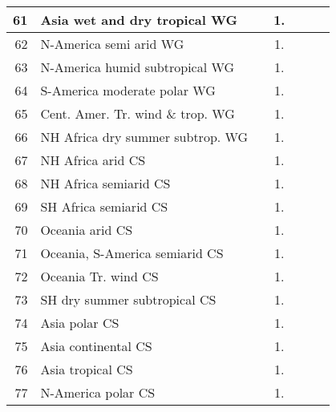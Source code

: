 {{\begin{tabular}{||r|l||c|c|c|c|c||}
 \hline
          61  & Asia wet and dry tropical WG                                 &       &  1.   &       &       \\
 \hline
          62  & N-America semi arid WG                                       &       &  1.   &       &       \\
 \hline
          63  & N-America humid subtropical WG                               &       &  1.   &       &       \\
 \hline
          64  & S-America moderate polar WG                                  &       &  1.   &       &       \\
 \hline
          65  & Cent. Amer. Tr. wind \& trop. WG                             &       &  1.   &       &       \\
 \hline
          66  & NH Africa dry summer subtrop. WG                             &       &  1.   &       &       \\
 \hline
 \hline
          67  & NH Africa arid CS                                            &       &  1.   &       &       \\
 \hline
          68  & NH Africa semiarid CS                                        &       &  1.   &       &       \\
 \hline
          69  & SH Africa semiarid CS                                        &       &  1.   &       &       \\
 \hline
          70  & Oceania arid CS                                              &       &  1.   &       &       \\
 \hline
          71  & Oceania, S-America semiarid CS                               &       &  1.   &       &       \\
 \hline
          72  & Oceania Tr. wind CS                                          &       &  1.   &       &       \\
 \hline
          73  & SH dry summer subtropical CS                                 &       &  1.   &       &       \\
 \hline
          74  & Asia polar CS                                                &       &  1.   &       &       \\
 \hline
          75  & Asia continental CS                                          &       &  1.   &       &       \\
 \hline
          76  & Asia tropical CS                                             &       &  1.   &       &       \\
 \hline
          77  & N-America polar CS                                           &       &  1.   &       &       \\

\end{tabular}}}

